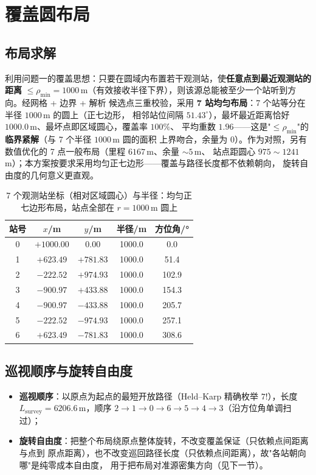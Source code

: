 \documentclass[a4paper,11pt]{ctexart}
\begin{document}
\section{覆盖圆布局}
\subsection{布局求解}
利用问题一的覆盖思想：只要在圆域内布置若干观测站，使\textbf{任意点到最近观测站的距离} $\le
\rho_{\min}=1000$\,m（有效接收半径下界），则该源总能被至少一个站听到方向。经网格 + 边界 + 解析
候选点三重校验，采用 \textbf{7 站均匀布局}：7 个站等分在半径 $1000$\,m 的圆上（正七边形，
相邻站位间隔 $51.43^\circ$），最坏最近距离恰好 $1000.0$\,m、最坏点即区域圆心，覆盖率 $100\%$、
平均重数 $1.96$——这是"$\le\rho_{\min}$"的\textbf{临界紧解}（与 7 个半径 $1000$\,m 圆的面积
上界吻合，余量为 $0$）。作为对照，另有数值优化的 7 点一般布局（里程 $6167$\,m、余量 $\sim5$\,m、
站点距圆心 $975\sim1241$\,m）；本方案按要求采用均匀正七边形——覆盖与路径长度都不依赖朝向，
旋转自由度的几何意义更直观。

\begin{table}[H]
  \centering
  \caption{7 个观测站坐标（相对区域圆心）与半径：均匀正七边形布局，站点全部在 $r=1000$\,m 圆上}
  \label{tab:centers}
  \begin{tabular}{ccccc}
    \toprule
    站号 & $x$/m & $y$/m & 半径/m & 方位角/° \\
    \midrule
    0 & $+1000.00$ & $0.00$ & 1000.0 & 0.0 \\
    1 & $+623.49$ & $+781.83$ & 1000.0 & 51.4 \\
    2 & $-222.52$ & $+974.93$ & 1000.0 & 102.9 \\
    3 & $-900.97$ & $+433.88$ & 1000.0 & 154.3 \\
    4 & $-900.97$ & $-433.88$ & 1000.0 & 205.7 \\
    5 & $-222.52$ & $-974.93$ & 1000.0 & 257.1 \\
    6 & $+623.49$ & $-781.83$ & 1000.0 & 308.6 \\
    \bottomrule
  \end{tabular}
\end{table}

\subsection{巡视顺序与旋转自由度}
\begin{itemize}
  \item \textbf{巡视顺序}：以原点为起点的最短开放路径（Held--Karp 精确枚举 $7!$），长度
        $L_{\text{survey}}=6206.6$\,m，顺序 $2\to1\to0\to6\to5\to4\to3$（沿方位角单调扫过）；
  \item \textbf{旋转自由度}：把整个布局绕原点整体旋转，不改变覆盖保证（只依赖点间距离与点到
        原点距离），也不改变巡回路径长度（只依赖点间距离），故"各站朝向哪"是纯零成本自由度，
        用于把布局对准源密集方向（见下一节）。
\end{itemize}
\end{document}
